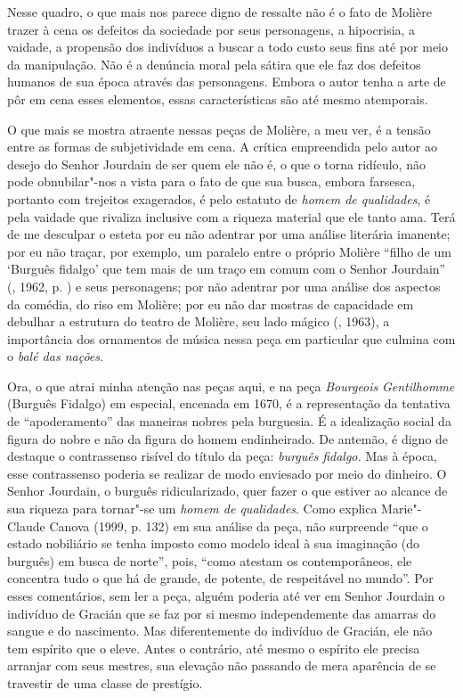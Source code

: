 Nesse quadro, o que mais nos parece digno de ressalte não é o fato de
Molière trazer à cena os defeitos da sociedade por seus personagens, a
hipocrisia, a vaidade, a propensão dos indivíduos a buscar a todo custo
seus fins até por meio da manipulação. Não é a denúncia moral pela
sátira que ele faz dos defeitos humanos de sua época através das
personagens. Embora o autor tenha a arte de pôr em cena esses elementos,
essas características são até mesmo atemporais.

O que mais se mostra atraente nessas peças de Molière, a meu ver, é a tensão entre as
formas de subjetividade em cena. A crítica empreendida pelo autor ao
desejo do Senhor Jourdain de ser quem ele não é, o que o torna ridículo,
não pode obnubilar"-nos a vista para o fato de que sua busca, embora farsesca,
portanto com trejeitos exagerados, é pelo estatuto de \emph{homem de
qualidades}, é pela vaidade que rivaliza inclusive com a riqueza
material que ele tanto ama. Terá de me desculpar o esteta por eu
não adentrar por uma análise literária imanente; por eu não traçar, por
exemplo, um paralelo entre o próprio Molière ``filho de um `Burguês
fidalgo' que tem mais de um traço em comum com o Senhor Jourdain'' (,
1962, p. ) e seus personagens; por não adentrar por uma análise dos
aspectos da comédia, do riso em Molière; por eu não dar
mostras de capacidade em debulhar a estrutura
do teatro de Molière, seu lado mágico (, 1963), a importância
dos ornamentos de música nessa peça em particular que culmina com o
\emph{balé das nações}.

Ora, o que atrai minha atenção nas peças aqui, e na peça
\emph{Bourgeois} \emph{Gentilhomme} (Burguês Fidalgo) em especial,
encenada em 1670, é a representação da tentativa de ``apoderamento'' das
maneiras nobres pela burguesia. É a idealização social da figura do
nobre e não da figura do homem endinheirado. De antemão, é digno de
destaque o contrassenso risível do título da peça: \emph{burguês}
\emph{fidalgo.} Mas à época, esse contrassenso poderia se realizar de
modo enviesado por meio do dinheiro. O Senhor Jourdain, o burguês
ridicularizado, quer fazer o que estiver ao alcance de sua riqueza para
tornar"-se um \emph{homem de qualidades}. Como explica Marie"-Claude
Canova (1999, p. 132) em sua análise da peça, não surpreende ``que o
estado nobiliário se tenha imposto como modelo ideal à sua imaginação
(do burguês) em busca de norte'', pois, ``como atestam os
contemporâneos, ele concentra tudo o que há de grande, de potente, de
respeitável no mundo''. Por esses comentários, sem ler a peça, alguém
poderia até ver em Senhor Jourdain o indivíduo de Gracián que se faz por
si mesmo independemente das amarras do sangue e do nascimento. Mas diferentemente do
indivíduo de Gracián, ele não tem espírito que o eleve. Antes o
contrário, até mesmo o espírito ele precisa arranjar com seus mestres,
sua elevação não passando de mera aparência de se travestir de uma
classe de prestígio.

